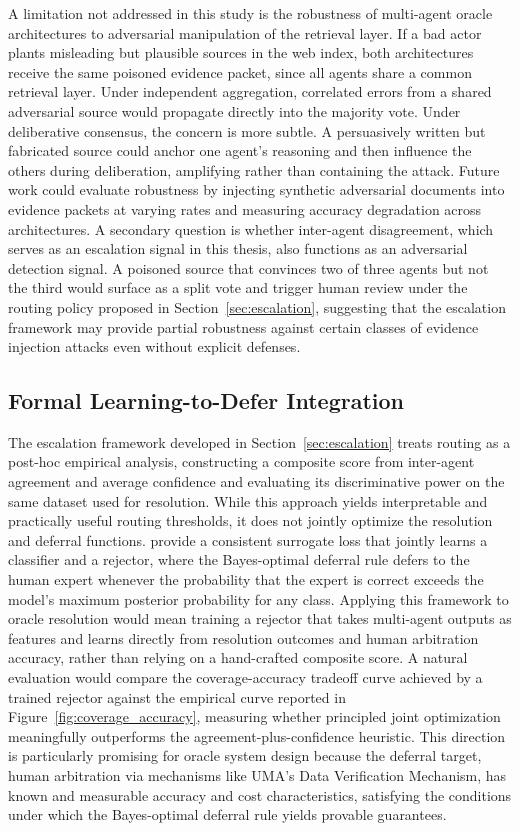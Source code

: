 A limitation not addressed in this study is the robustness of multi-agent oracle architectures to adversarial manipulation of the retrieval layer. If a bad actor plants misleading but plausible sources in the web index, both architectures receive the same poisoned evidence packet, since all agents share a common retrieval layer. Under independent aggregation, correlated errors from a shared adversarial source would propagate directly into the majority vote. Under deliberative consensus, the concern is more subtle. A persuasively written but fabricated source could anchor one agent's reasoning and then influence the others during deliberation, amplifying rather than containing the attack. Future work could evaluate robustness by injecting synthetic adversarial documents into evidence packets at varying rates and measuring accuracy degradation across architectures. A secondary question is whether inter-agent disagreement, which serves as an escalation signal in this thesis, also functions as an adversarial detection signal. A poisoned source that convinces two of three agents but not the third would surface as a split vote and trigger human review under the routing policy proposed in Section~\ref{sec:escalation}, suggesting that the escalation framework may provide partial robustness against certain classes of evidence injection attacks even without explicit defenses.

\subsection{Formal Learning-to-Defer Integration}

The escalation framework developed in Section~\ref{sec:escalation} treats routing as a post-hoc empirical analysis, constructing a composite score from inter-agent agreement and average confidence and evaluating its discriminative power on the same dataset used for resolution. While this approach yields interpretable and practically useful routing thresholds, it does not jointly optimize the resolution and deferral functions. \cite{mozannar2020consistent} provide a consistent surrogate loss that jointly learns a classifier and a rejector, where the Bayes-optimal deferral rule defers to the human expert whenever the probability that the expert is correct exceeds the model's maximum posterior probability for any class. Applying this framework to oracle resolution would mean training a rejector that takes multi-agent outputs as features and learns directly from resolution outcomes and human arbitration accuracy, rather than relying on a hand-crafted composite score. A natural evaluation would compare the coverage-accuracy tradeoff curve achieved by a trained rejector against the empirical curve reported in Figure~\ref{fig:coverage_accuracy}, measuring whether principled joint optimization meaningfully outperforms the agreement-plus-confidence heuristic. This direction is particularly promising for oracle system design because the deferral target, human arbitration via mechanisms like UMA's Data Verification Mechanism, has known and measurable accuracy and cost characteristics, satisfying the conditions under which the Bayes-optimal deferral rule yields provable guarantees.